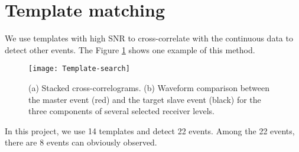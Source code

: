 \section{Template matching}
We use templates with high SNR to cross-correlate with the continuous data to detect other events. The Figure \ref{fig:method} shows one example of this method.
\begin{figure}[htbp] 
\centering 
\texttt{[image: Template-search]} 
\caption{\label{fig:method} (a) Stacked cross-correlograms. (b) Waveform comparison between the master event (red) and the target slave event (black) for the three components of several selected receiver levels.} 
\end{figure}
In this project, we use 14 templates and detect 22 events. Among the 22 events, there are 8 events can obviously observed.

